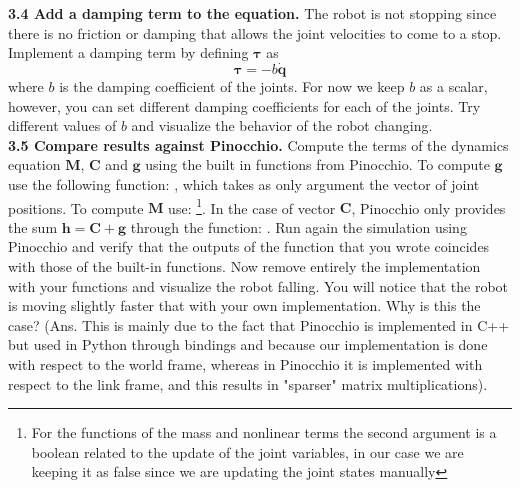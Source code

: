 \documentclass[11pt]{article}
\begin{document}
\textbf{3.4 Add a damping term to the equation.} The robot is not stopping since there is no friction or damping that allows the joint velocities to come to a stop. Implement a damping term by defining $\mathbf{\tau}$ as
\begin{equation*}
	\boldsymbol{\tau} = -b\dot{\mathbf{q}}
\end{equation*} 
where $b$ is the damping coefficient of the joints. For now we keep $b$ as a scalar, however, you can set different damping coefficients for each of the joints. Try different values of $b$ and visualize the behavior of the robot changing.\\


\textbf{3.5 Compare results against Pinocchio.} Compute the terms of the dynamics equation $\mathbf{M}$, $\mathbf{C}$ and $\mathbf{g}$ using the built in functions from Pinocchio. To compute $\mathbf{g}$ use the following function: , which takes as only argument the vector of joint positions. To compute $\mathbf{M}$ use: \footnote{For the functions of the mass and nonlinear terms the second argument is a boolean related to the update of the joint variables, in our case we are keeping it as false since we are updating the joint states manually}. In the case of vector $\mathbf{C}$, Pinocchio only provides the sum $\mathbf{h} = \mathbf{C} +  \mathbf{g}$ through the function: . Run again the simulation using Pinocchio and verify that the outputs of the function that you wrote coincides with those of the built-in functions. Now remove entirely the implementation with your functions and visualize the robot falling. You will notice that the robot is moving slightly faster that with your own implementation. Why is this the case? (Ans. This is mainly due to the fact that Pinocchio is implemented in C++ but used in Python through bindings and because our implementation is done with respect to the world frame, whereas in Pinocchio it is implemented with respect to the link frame, and this results in "sparser" matrix multiplications).
\end{document}
